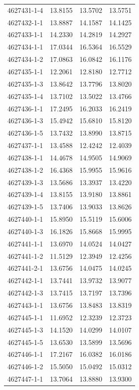 \begin{longtable}{lrrr}
4627431-1-4 & 13.8155 & 13.5702 & 13.5751 \\
4627432-1-1 & 13.8887 & 14.1587 & 14.1425 \\
4627433-1-1 & 14.2330 & 14.2819 & 14.2927 \\
4627434-1-1 & 17.0344 & 16.5364 & 16.5529 \\
4627434-1-2 & 17.0863 & 16.0842 & 16.1176 \\
4627435-1-1 & 12.2061 & 12.8180 & 12.7712 \\
4627435-1-3 & 13.8642 & 13.7796 & 13.8020 \\
4627435-1-4 & 13.7102 & 13.5022 & 13.4766 \\
4627436-1-1 & 17.2495 & 16.2033 & 16.2419 \\
4627436-1-3 & 15.4942 & 15.6810 & 15.8120 \\
4627436-1-5 & 13.7432 & 13.8990 & 13.8715 \\
4627437-1-1 & 13.4588 & 12.4242 & 12.4039 \\
4627438-1-1 & 14.4678 & 14.9505 & 14.9069 \\
4627438-1-2 & 16.4368 & 15.9955 & 15.9616 \\
4627439-1-3 & 13.5686 & 13.3937 & 13.4220 \\
4627439-1-4 & 13.8155 & 13.9180 & 13.8861 \\
4627439-1-5 & 13.7406 & 13.9033 & 13.8626 \\
4627440-1-1 & 15.8950 & 15.5119 & 15.6006 \\
4627440-1-3 & 16.1826 & 15.8668 & 15.9995 \\
4627441-1-1 & 13.6970 & 14.0524 & 14.0427 \\
4627441-1-2 & 11.5129 & 12.3949 & 12.4256 \\
4627441-2-1 & 13.6756 & 14.0475 & 14.0245 \\
4627442-1-1 & 13.7441 & 13.9732 & 13.9077 \\
4627442-1-3 & 13.7415 & 13.7197 & 13.7396 \\
4627443-1-1 & 13.6756 & 13.8483 & 13.8319 \\
4627445-1-1 & 11.6952 & 12.3239 & 12.3723 \\
4627445-1-3 & 14.1520 & 14.0299 & 14.0107 \\
4627445-1-5 & 13.6530 & 13.5899 & 13.5696 \\
4627446-1-1 & 17.2167 & 16.0382 & 16.0186 \\
4627446-1-2 & 15.5050 & 15.0492 & 15.0312 \\
4627447-1-1 & 13.7064 & 13.8880 & 13.9300 \\

\end{longtable}
